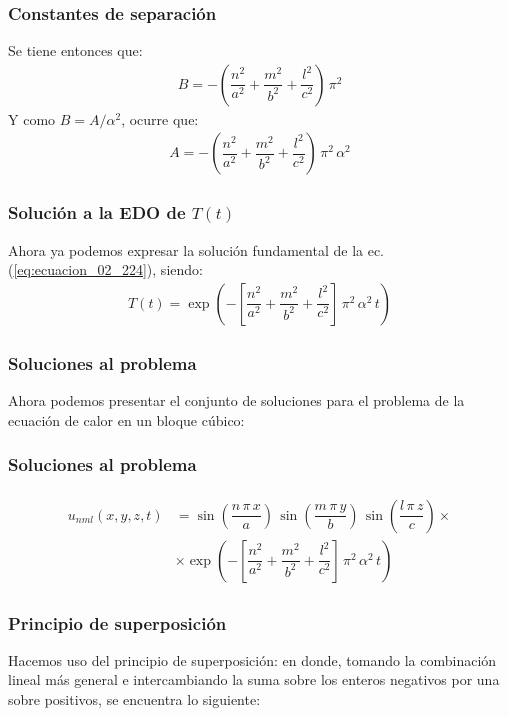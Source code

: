 \documentclass[12pt]{beamer}
\begin{document}
\begin{frame}
\frametitle{Constantes de separación}
Se tiene entonces que:
\begin{align*}
B = - \left( \dfrac{n^{2}}{a^{2}} + \dfrac{m^{2}}{b^{2}} + \dfrac{l^{2}}{c^{2}} \right) \, \pi^{2}
\end{align*}
\pause
Y como $B = A / \alpha^{2}$, ocurre que:
\pause
\begin{align}
A = - \left( \dfrac{n^{2}}{a^{2}} + \dfrac{m^{2}}{b^{2}} + \dfrac{l^{2}}{c^{2}} \right) \, \pi^{2} \, \alpha^{2}
\label{eq:ecuacion_02_237}
\end{align}
\end{frame}
\begin{frame}
\frametitle{Solución a la EDO de $T (t)$}
Ahora ya podemos expresar la solución fundamental de la ec. (\ref{eq:ecuacion_02_224}), siendo:
\begin{align}
T (t) = \exp \left( - \left[ \dfrac{n^{2}}{a^{2}} + \dfrac{m^{2}}{b^{2}} + \dfrac{l^{2}}{c^{2}} \right] \, \pi^{2} \, \alpha^{2}\, t \right)
\label{eq:ecuacion_02_238}
\end{align}
\end{frame}
\begin{frame}
\frametitle{Soluciones al problema}
Ahora podemos presentar el conjunto de soluciones para el problema de la ecuación de calor en un bloque cúbico:
\end{frame}
\begin{frame}
\frametitle{Soluciones al problema}
\begin{align}
\begin{aligned}
u_{nml} (x, y, z, t) &= \sin \left(\dfrac{n \, \pi \, x}{a} \right) \, \sin \left( \dfrac{m \, \pi \, y}{b} \right) \, \sin \left( \dfrac{l \, \pi \, z}{c} \right) \times \\[1em]
&\times \exp \left( - \left[ \dfrac{n^{2}}{a^{2}} + \dfrac{m^{2}}{b^{2}} + \dfrac{l^{2}}{c^{2}} \right] \, \pi^{2} \, \alpha^{2}\, t \right)
\end{aligned}
\label{eq:ecuacion_02_239}
\end{align}
\end{frame}
\begin{frame}
\frametitle{Principio de superposición}
Hacemos uso del principio de superposición: en donde, tomando la combinación lineal más general e intercambiando la suma sobre los enteros negativos por una sobre positivos, se encuentra lo siguiente:
\end{frame}
\end{document}
